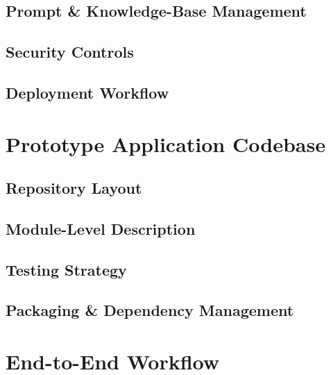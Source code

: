 \subsection{Prompt & Knowledge-Base Management}

\subsection{Security Controls}

\subsection{Deployment Workflow}

\section{Prototype Application Codebase}

\subsection{Repository Layout}

\subsection{Module-Level Description}

\subsection{Testing Strategy}

\subsection{Packaging & Dependency Management}

\section{End-to-End Workflow}

